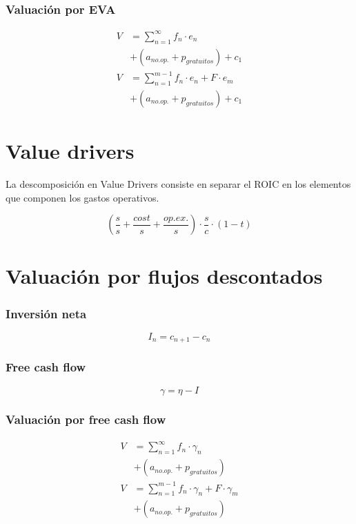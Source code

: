 \subsubsection*{Valuación por EVA}
\begin{align*}
    V   &= \sum_{n=1}^\infty f_n \cdot e_n \\
        & + \left(a_{no.op.}+p_{gratuitos}\right) + c_1\\
    V   &= \sum_{n=1}^{m-1} f_n \cdot e_n + F \cdot e_m\\
        & + \left(a_{no.op.}+p_{gratuitos}\right) + c_1
\end{align*}


\section{Value drivers}

La descomposición en Value Drivers consiste en separar el ROIC en los elementos que componen los gastos operativos.

\begin{equation}
    \left(\frac{s}{s}+\frac{cost}{s}+\frac{op.ex.}{s}\right)\cdot \frac{s}{c}\cdot(1-t)
\end{equation}

\section{Valuación por flujos descontados}

\subsubsection*{Inversión neta}
\begin{equation}
    I_n = c_{n+1} - c_{n}
\end{equation}

\subsubsection*{Free cash flow}
\begin{equation}
    \gamma = \eta - I
\end{equation}

\subsubsection*{Valuación por free cash flow}

\begin{align*}
    V   &= \sum_{n=1}^\infty f_n \cdot \gamma_n \\
        & + \left(a_{no.op.}+p_{gratuitos}\right)\\
    V   &= \sum_{n=1}^{m-1} f_n \cdot \gamma_n + F \cdot \gamma_m\\
        & + \left(a_{no.op.}+p_{gratuitos}\right)
\end{align*}

